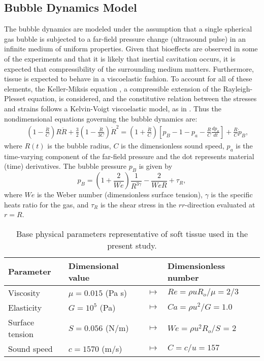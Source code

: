 \documentclass[%
preprint,%
author-year,%
]{jasatex}
\begin{document}
\subsection{Bubble Dynamics Model}

The bubble dynamics are modeled under the assumption that a single spherical
gas bubble is subjected to a far-field pressure change (ultrasound
pulse) in an infinite medium of uniform properties.  Given that
bioeffects are observed in some of the experiments and that it is
likely that inertial cavitation occurs, it is expected that
compressibility of the surrounding medium matters. Furthermore, tissue
is expected to behave in a viscoelastic fashion. To account for all of
these elements, the Keller-Miksis equation \cite[]{keller1980}, a
compressible extension of the Rayleigh-Plesset equation, is
considered, and the constitutive relation between the stresses and
strains follows a Kelvin-Voigt viscoelastic model, as in
\cite{yang2005}. Thus the nondimensional equations governing the
bubble dynamics are:
\begin{eqnarray}\label{eq:keller}
  &&\left(1-\frac{\dot{R}}{C}\right) R \ddot{R} +
    \frac{3}{2}\left(1-\frac{\dot{R}}{3 C}\right) \dot{R}^2 \nonumber  %
     = \left(1+\frac{\dot{R}}{C}\right) \left[p_B- 1 -p_a -
    \frac{R}{C}\frac{dp_a}{dt}\right] +\frac{R}{C} \dot{p}_B,
\end{eqnarray}
where $R(t)$ is the bubble radius, $C$ is the dimensionless sound
speed, $p_a$ is the
time-varying component of the far-field pressure and the dot
represents material (time) derivatives. The bubble pressure $p_B$ is
given by
\begin{equation}\label{eq:bubble_pressure}
  p_B = \left(1+\frac{2}{We}\right)\frac{1}{R^{3\gamma}}-\frac{2}{We
  R} + \tau_R,
\end{equation}
where $We$ is the Weber number (dimensionless surface tension),
$\gamma$ is the specific heats ratio for the gas, and
$\tau_R$ is the shear stress in the $rr$-direction
evaluated at $r=R$.  

\begin{table*}[!t]
  \centering
  \begin{tabular}{l l c l}
    Parameter & Dimensional value & & Dimensionless number \\ \hline
    Viscosity & $\mu=0.015$ (Pa s) & $\mapsto$ & $Re=\rho u R_o / \mu = 2/3$ \\
    Elasticity & $G=10^5$ (Pa) & $\mapsto$ & $Ca= \rho u^2 / G = 1.0$ 	\\
    Surface tension & $S=0.056$ (N/m) & $\mapsto$ & $We=\rho u^2 R_o / S$ = 2 \\
    Sound speed & $c=1570$ (m/s) & $\mapsto$ & $C = c/u=157$ \\  
  \end{tabular} 
  \caption{Base physical parameters representative of soft tissue used
    in the present study.}
  \label{tab:parameters}
\end{table*}
\end{document}
